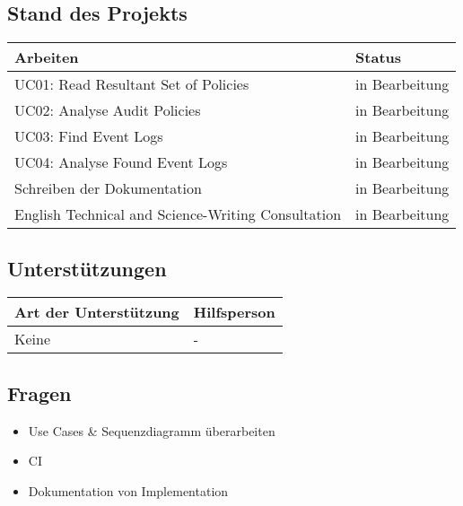 \subsection*{Stand des Projekts}
\begin{table}[H]
    \centering
    \begin{tabular}{p{12cm} p{4cm}}
        \textbf{Arbeiten} & \textbf{Status} \\ \hline
        UC01: Read Resultant Set of Policies & in Bearbeitung \\ \hline
        UC02: Analyse Audit Policies & in Bearbeitung \\ \hline
        UC03: Find Event Logs & in Bearbeitung\\ \hline
        UC04: Analyse Found Event Logs & in Bearbeitung\\ \hline
        Schreiben der Dokumentation & in Bearbeitung \\ \hline
        English Technical and Science-Writing Consultation & in Bearbeitung \\ \hline
    \end{tabular}
\end{table}

\vspace{1cm}

\subsection*{Unterstützungen}
\begin{table}[H]
    \centering
    \begin{tabular}{p{12cm} p{4cm}}
        \textbf{Art der Unterstützung} & \textbf{Hilfsperson} \\ \hline
        Keine & - \\ \hline
    \end{tabular}
\end{table}

\vspace{1cm}

\subsection*{Fragen}
\begin{itemize}
    \item Use Cases \& Sequenzdiagramm überarbeiten
    \item CI 
    \item Dokumentation von Implementation
\end{itemize}

